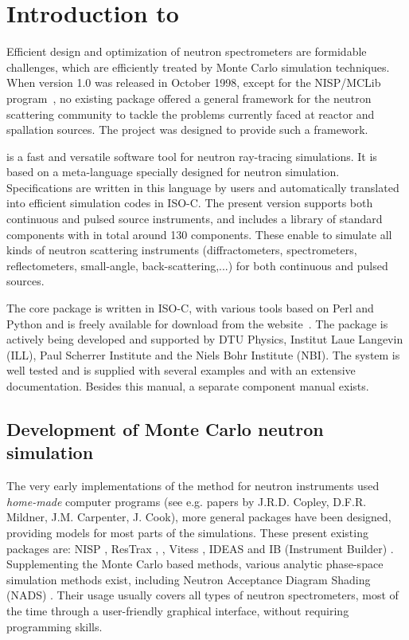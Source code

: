 
\chapter{Introduction to \MCS}

Efficient design and optimization of neutron spectrometers are
formidable challenges, which are efficiently treated by Monte Carlo
simulation techniques.
When \MCS version 1.0 was released in October
1998, except for the NISP/MCLib program~\cite{nisp_webpage}, no existing package offered a general framework for the neutron
scattering community to tackle the problems currently faced at reactor and
spallation sources. The \MCS project was designed to provide such a framework.

\MCS %
is a fast and versatile software tool for neutron ray-tracing simulations.
It is based on a meta-language specially designed for neutron
simulation. Specifications are written in this language by users and
automatically translated into efficient simulation codes in ISO-C.
The present version supports both continuous and pulsed source instruments, and includes a library of standard
components with in total around 130 components. These enable to simulate all kinds of neutron scattering instruments (diffractometers, spectrometers, reflectometers, small-angle, back-scattering,...) for both continuous and pulsed sources.

The core \MCS package is written in ISO-C, with various tools based
on Perl and Python and is freely available for download
from the \MCS website~\cite{mcstas_webpage}. The package is actively
being developed and supported by DTU Physics,
Institut Laue Langevin (ILL), Paul Scherrer Institute and the Niels
Bohr Institute (NBI).
The system is well tested and
is supplied with several examples and with an extensive documentation.
Besides this manual, a separate component manual exists.

\section{Development of Monte Carlo neutron simulation}
The very early implementations of the method for neutron instruments used \emph{home-made} computer programs  (see e.g. papers by J.R.D. Copley, D.F.R. Mildner, J.M. Carpenter, J. Cook), more general packages have been designed, providing models for most parts of the simulations.
These present existing packages are: NISP \cite{NISP}, ResTrax
\cite{Restrax}, \MCS\cite{mcs_ppf,nn_10_20,mcstas_pb,mcs_ppf,mcstas_webpage},
Vitess \cite{Vitess,vitess_webpage}, IDEAS \cite{IDEAS} and IB (Instrument
Builder) \cite{IB_webpage}. Supplementing the Monte Carlo based
methods, various analytic phase-space simulation methods exist,
including Neutron Acceptance Diagram Shading (NADS) \cite{NADS_webpage}.
Their usage usually covers all types of neutron spectrometers, most of the time through a user-friendly graphical interface, without requiring programming skills.

